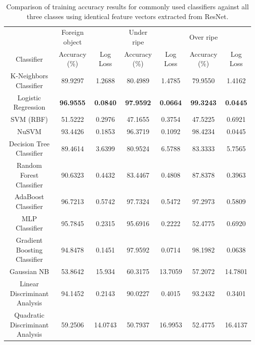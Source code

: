 \documentclass[fleqn,twoside,12pt]{report}
\begin{document}
\begin{table}
	\centering
	\caption{Comparison of training accuracy results for commonly used classifiers against all three classes using identical feature vectors extracted from ResNet.}
	\label{tab:classifiers}
	\begin{tabular}{ccccccc}
		\toprule
		& Foreign object &          & Under ripe    &          & Over ripe     &           \\  
		Classifier & Accuracy (\%)  & Log Loss & Accuracy (\%) & Log Loss & Accuracy (\%) & Log Loss  \\ 
		\midrule
		K-Neighbors Classifier          & 89.9297  & 1.2688 & 80.4989 & 1.4785 & 79.9550 & 1.4162 \\[6pt] 
		Logistic Regression	            & \textbf{96.9555}  & \textbf{0.0840} & \textbf{97.9592} & \textbf{0.0664} &  \textbf{99.3243} & \textbf{0.0445} \\[6pt]
		SVM (RBF)	                    & 51.5222  & 0.2976 & 47.1655 & 0.3754 & 47.5225 & 0.6921 \\[6pt]
		NuSVM	                        & 93.4426  & 0.1853 & 96.3719 & 0.1092 & 98.4234 & 0.0445 \\[6pt]
		Decision Tree Classifier	    & 89.4614  & 3.6399 & 80.9524 & 6.5788 & 83.3333 & 5.7565 \\[6pt]
		Random Forest Classifier	    & 90.6323  & 0.4432 & 83.4467 & 0.4808 & 87.8378 & 0.3963 \\[6pt]
		AdaBoost Classifier	            & 96.7213  & 0.5742 & 97.7324 & 0.5472 & 97.2973 & 0.5809 \\[6pt]
		MLP Classifier	                & 95.7845  & 0.2315 & 95.6916 & 0.2222 & 52.4775 & 0.6920 \\[6pt]
		Gradient Boosting Classifier	& 94.8478  & 0.1451 & 97.9592 & 0.0714 & 98.1982 & 0.0638 \\[6pt]
		Gaussian NB	                    & 53.8642  & 15.934 & 60.3175 & 13.7059 & 57.2072 & 14.7801 \\[6pt]
		Linear Discriminant Analysis	& 94.1452  & 0.2143 & 90.0227 & 0.4015 & 93.2432 & 0.3401 \\[6pt]
		Quadratic Discriminant Analysis	& 59.2506  & 14.0743 & 50.7937 & 16.9953 & 52.4775 & 16.4137 \\[6pt]
		\bottomrule 
	\end{tabular}
\end{table}
\end{document}
